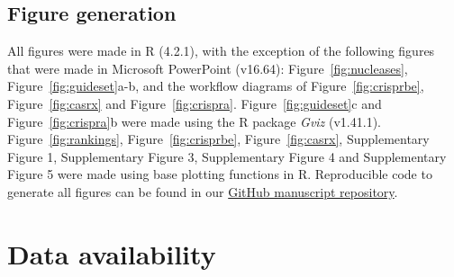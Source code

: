 \documentclass[pdftex,english,10pt]{article}
\begin{document}
{%

\subsection*{Figure generation}

All figures were made in R (4.2.1), with the exception of the following figures that were made in Microsoft PowerPoint (v16.64): Figure~\ref{fig:nucleases}, Figure~\ref{fig:guideset}a-b, and the workflow diagrams of Figure~\ref{fig:crisprbe}, Figure~\ref{fig:casrx} and Figure~\ref{fig:crispra}.  Figure~\ref{fig:guideset}c and Figure~\ref{fig:crispra}b were made using the R package \textit{Gviz} (v1.41.1). Figure~\ref{fig:rankings}, Figure~\ref{fig:crisprbe}, Figure~\ref{fig:casrx}, Supplementary Figure 1, Supplementary Figure 3, Supplementary Figure 4 and Supplementary Figure 5 were made using base plotting functions in R. Reproducible code to generate all figures can be found in our \href{https://github.com/crisprVerse/crisprVersePaper}{GitHub manuscript repository}. 



\section*{Data availability}


}
\end{document}
